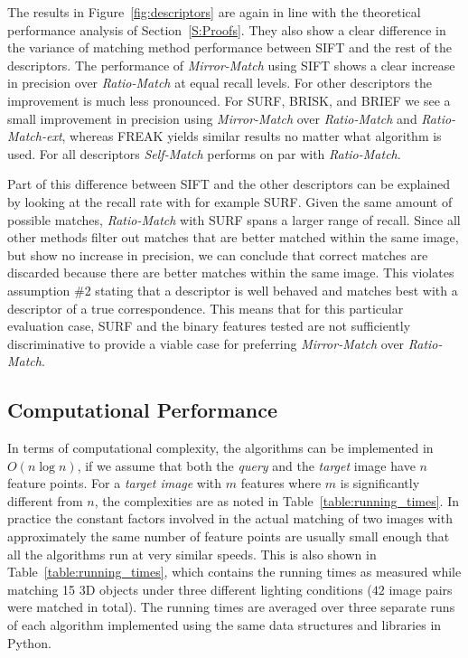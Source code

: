 \documentclass[review]{elsarticle}
\begin{document}
The results in Figure~\ref{fig:descriptors} are again in line with the theoretical performance analysis of Section~\ref{S:Proofs}. They also show a clear difference in the variance of matching method performance between SIFT and the rest of the descriptors. The performance of \emph{Mirror-Match} using SIFT shows a clear increase in precision over \emph{Ratio-Match} at equal recall levels. For other descriptors the improvement is much less pronounced.  For SURF, BRISK, and BRIEF we see a small improvement in precision using \emph{Mirror-Match} over \emph{Ratio-Match} and \emph{Ratio-Match-ext}, whereas FREAK yields similar results no matter what algorithm is used.  For all descriptors \emph{Self-Match} performs on par with \emph{Ratio-Match}.

Part of this difference between SIFT and the other descriptors can be explained by looking at the recall rate with for example SURF\@. Given the same amount of possible matches, \emph{Ratio-Match} with SURF spans a larger range of recall.  Since all other methods filter out matches that are better matched within the same image, but show no increase in precision, we can conclude that correct matches are discarded because there are better matches within the same image. This violates assumption \#2 stating that a descriptor is well behaved and matches best with a descriptor of a true correspondence. This means that for this particular evaluation case, SURF and the binary features tested are not sufficiently discriminative to provide a viable case for preferring \emph{Mirror-Match} over \emph{Ratio-Match}.

\subsection{Computational Performance}

In terms of computational complexity, the algorithms can be implemented in $O(n\log n)$, if we assume that both the \emph{query} and the \emph{target} image have $n$ feature points. For a \emph{target image} with $m$ features where $m$ is significantly different from $n$, the complexities are as noted in Table~\ref{table:running_times}. In practice the constant factors involved in the actual matching of two images with approximately the same number of feature points are usually small enough that all the algorithms run at very similar speeds. This is also shown in Table~\ref{table:running_times}, which contains the running times as measured while matching 15 3D objects under three different lighting conditions ($42$ image pairs were matched in total). The running times are averaged over three separate runs of each algorithm implemented using the same data structures and libraries in Python. 
\end{document}
